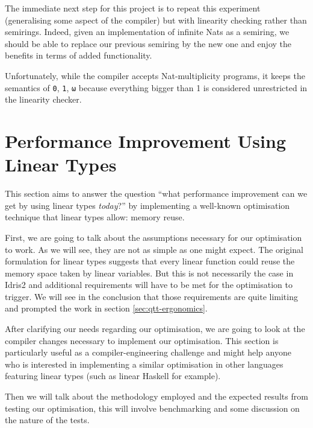 \documentclass[
]{article}
\begin{document}
The immediate next step for this project is to repeat this experiment
(generalising some aspect of the compiler) but with linearity checking
rather than semirings. Indeed, given an implementation of infinite Nats
as a semiring, we should be able to replace our previous semiring by the
new one and enjoy the benefits in terms of added functionality.

Unfortunately, while the compiler accepts Nat-multiplicity programs, it
keeps the semantics of \texttt{0}, \texttt{1}, \texttt{ω} because
everything bigger than 1 is considered unrestricted in the linearity
checker.

\newpage

\hypertarget{performance-improvement-using-linear-types}{%
\section{Performance Improvement Using Linear
Types}\label{performance-improvement-using-linear-types}}

\label{sec:performance}

This section aims to answer the question ``what performance improvement
can we get by using linear types \emph{today}?'' by implementing a
well-known optimisation technique that linear types allow: memory reuse.

First, we are going to talk about the assumptions necessary for our
optimisation to work. As we will see, they are not as simple as one
might expect. The original formulation for linear types suggests that
every linear function could reuse the memory space taken by linear
variables. But this is not necessarily the case in Idris2 and additional
requirements will have to be met for the optimisation to trigger. We
will see in the conclusion that those requirements are quite limiting
and prompted the work in section \ref{sec:qtt-ergonomics}.

After clarifying our needs regarding our optimisation, we are going to
look at the compiler changes necessary to implement our optimisation.
This section is particularly useful as a compiler-engineering challenge
and might help anyone who is interested in implementing a similar
optimisation in other languages featuring linear types (such as linear
Haskell for example).

Then we will talk about the methodology employed and the expected
results from testing our optimisation, this will involve benchmarking
and some discussion on the nature of the tests.
\end{document}

